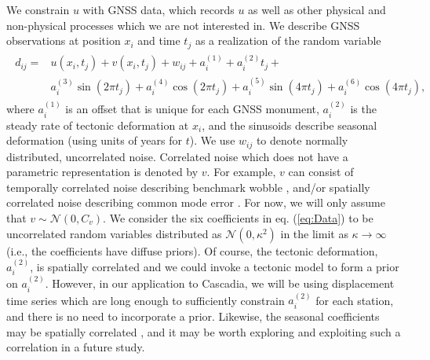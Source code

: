 \documentclass[10pt,a4paper]{article}
\begin{document}
We constrain $u$ with GNSS data, which records $u$ as well as other physical and non-physical processes which we are not interested in. We describe GNSS observations at position $x_i$ and time $t_j$ as a realization of the random variable 
\begin{align}\label{eq:Data}
\begin{split}
d_{ij} = &u(x_i,t_j) + v(x_i,t_j) + w_{ij} + a^{(1)}_i + a^{(2)}_it_j + \\
         &a^{(3)}_i\sin(2 \pi t_j) + a^{(4)}_i\cos(2 \pi t_j) + a^{(5)}_i\sin(4 \pi t_j) + a^{(6)}_i\cos(4 \pi t_j), 
\end{split}
\end{align}
where $a^{(1)}_{i}$ is an offset that is unique for each GNSS monument, $a^{(2)}_{i}$ is the steady rate of tectonic deformation at $x_i$, and the sinusoids describe seasonal deformation (using units of years for $t$). We use $w_{ij}$ to denote normally distributed, uncorrelated noise. Correlated noise which does not have a parametric representation is denoted by $v$.  For example, $v$ can consist of temporally correlated noise describing benchmark wobble \citep[e.g.,][]{Wyatt1982,Wyatt1989}, and/or spatially correlated noise describing common mode error \citep[e.g.,][]{Wdowinski1997}. For now, we will only assume that $v \sim \mathcal{N}(0,C_v)$. We consider the six coefficients in eq. (\ref{eq:Data}) to be uncorrelated random variables distributed as $\mathcal{N}(0,\kappa^2)$ in the limit as $\kappa \to \infty$ (i.e., the coefficients have diffuse priors). Of course, the tectonic deformation, $a^{(2)}_{i}$, is spatially correlated and we could invoke a tectonic model to form a prior on $a^{(2)}_{i}$. However, in our application to Cascadia, we will be using displacement time series which are long enough to sufficiently constrain $a^{(2)}_{i}$ for each station, and there is no need to incorporate a prior. Likewise, the seasonal coefficients may be spatially correlated \citep{Langbein2008}, and it may be worth exploring and exploiting such a correlation in a future study. 
\end{document}
